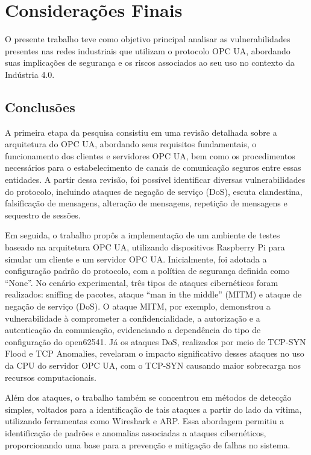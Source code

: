 \chapter{Considerações Finais} \label{cap:conclusao}

    O presente trabalho teve como objetivo principal analisar as vulnerabilidades presentes nas redes industriais que utilizam o protocolo OPC UA, abordando suas implicações de segurança e os riscos associados ao seu uso no contexto da Indústria 4.0.

\section{Conclusões}

    A primeira etapa da pesquisa consistiu em uma revisão detalhada sobre a arquitetura do OPC UA, abordando seus requisitos fundamentais, o funcionamento dos clientes e servidores OPC UA, bem como os procedimentos necessários para o estabelecimento de canais de comunicação seguros entre essas entidades. A partir dessa revisão, foi possível identificar diversas vulnerabilidades do protocolo, incluindo ataques de negação de serviço (DoS), escuta clandestina, falsificação de mensagens, alteração de mensagens, repetição de mensagens e sequestro de sessões.

    Em seguida, o trabalho propôs a implementação de um ambiente de testes baseado na arquitetura OPC UA, utilizando dispositivos Raspberry Pi para simular um cliente e um servidor OPC UA. Inicialmente, foi adotada a configuração padrão do protocolo, com a política de segurança definida como ``None''. No cenário experimental, três tipos de ataques cibernéticos foram realizados: sniffing de pacotes, ataque ``man in the middle'' (MITM) e ataque de negação de serviço (DoS). O ataque MITM, por exemplo, demonstrou a vulnerabilidade à comprometer a confidencialidade, a autorização e a autenticação da comunicação, evidenciando a dependência do tipo de configuração do open62541. Já os ataques DoS, realizados por meio de TCP-SYN Flood e TCP Anomalies, revelaram o impacto significativo desses ataques no uso da CPU do servidor OPC UA, com o TCP-SYN causando maior sobrecarga nos recursos computacionais.

    Além dos ataques, o trabalho também se concentrou em métodos de detecção simples, voltados para a identificação de tais ataques a partir do lado da vítima, utilizando ferramentas como Wireshark e ARP. Essa abordagem permitiu a identificação de padrões e anomalias associadas a ataques cibernéticos, proporcionando uma base para a prevenção e mitigação de falhas no sistema.

